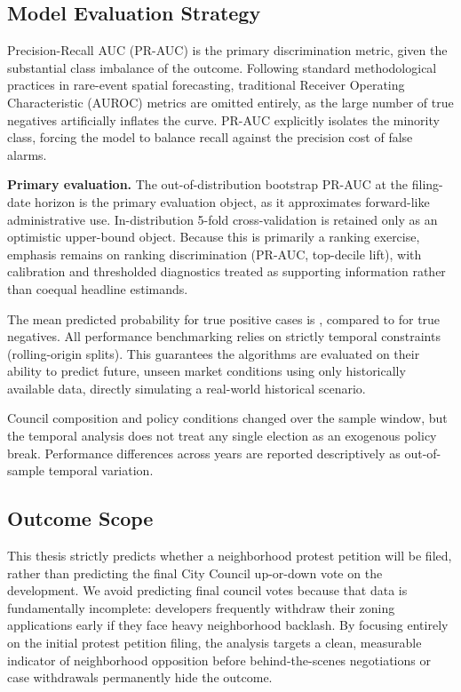 \documentclass[11pt, letterpaper, oneside]{article}
\begin{document}
  \subsection{Model Evaluation Strategy}

Precision-Recall AUC (PR-AUC) is the primary discrimination metric, given the substantial class imbalance of the outcome. Following standard methodological practices in rare-event spatial forecasting, traditional Receiver Operating Characteristic (AUROC) metrics are omitted entirely, as the large number of true negatives artificially inflates the curve. PR-AUC explicitly isolates the minority class, forcing the model to balance recall against the precision cost of false alarms.

\textbf{Primary evaluation.} The out-of-distribution bootstrap PR-AUC at the filing-date horizon is the primary evaluation object, as it approximates forward-like administrative use. In-distribution 5-fold cross-validation is retained only as an optimistic upper-bound object. Because this is primarily a ranking exercise, emphasis remains on ranking discrimination (PR-AUC, top-decile lift), with calibration and thresholded diagnostics treated as supporting information rather than coequal headline estimands.


The mean predicted probability for true positive cases is \metricMeanProbTP{}, compared to \metricMeanProbTN{} for true negatives. All performance benchmarking relies on strictly temporal constraints (rolling-origin splits). This guarantees the algorithms are evaluated on their ability to predict future, unseen market conditions using only historically available data, directly simulating a real-world historical scenario.

Council composition and policy conditions changed over the sample window, but the temporal analysis does not treat any single election as an exogenous policy break. Performance differences across years are reported descriptively as out-of-sample temporal variation.


\subsection{Outcome Scope}
\label{sec:supporting_stages}

This thesis strictly predicts whether a neighborhood protest petition will be filed, rather than predicting the final City Council up-or-down vote on the development. We avoid predicting final council votes because that data is fundamentally incomplete: developers frequently withdraw their zoning applications early if they face heavy neighborhood backlash. By focusing entirely on the initial protest petition filing, the analysis targets a clean, measurable indicator of neighborhood opposition before behind-the-scenes negotiations or case withdrawals permanently hide the outcome.
\end{document}
